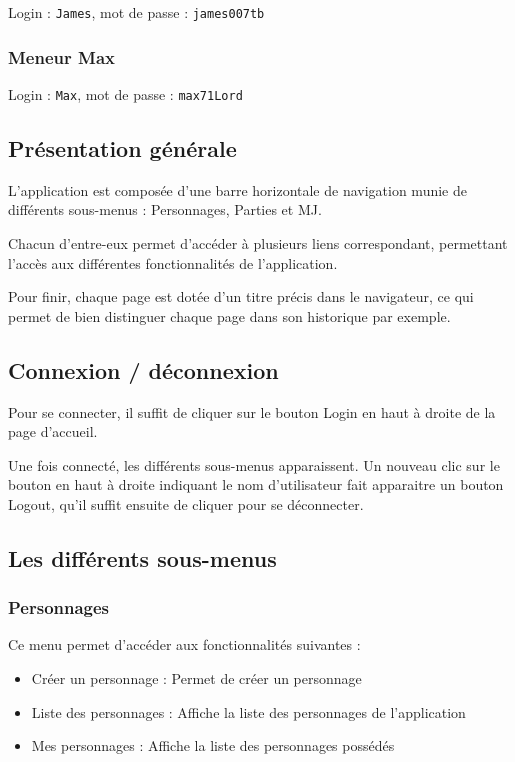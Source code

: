 \documentclass[a4paper, 11pt, titlepage]{article}
\begin{document}
Login : \lstinline!James!, mot de passe : \lstinline!james007tb!


\subsubsection {Meneur Max}

Login : \lstinline!Max!, mot de passe : \lstinline!max71Lord!




\subsection {Présentation générale}

L'application est composée d'une barre horizontale de navigation munie de différents sous-menus : Personnages, Parties et MJ.

Chacun d'entre-eux permet d'accéder à plusieurs liens correspondant, permettant l'accès aux différentes fonctionnalités de l'application.

Pour finir, chaque page est dotée d'un titre précis dans le navigateur, ce qui permet de bien distinguer chaque page dans son historique par exemple.

\subsection {Connexion / déconnexion}

Pour se connecter, il suffit de cliquer sur le bouton Login en haut à droite de la page d'accueil.

Une fois connecté, les différents sous-menus apparaissent. Un nouveau clic sur le bouton en haut à droite indiquant le nom d'utilisateur fait apparaitre un bouton Logout, qu'il suffit ensuite de cliquer pour se déconnecter.


\subsection {Les différents sous-menus}

\subsubsection {Personnages}

Ce menu permet d'accéder aux fonctionnalités suivantes :

\begin{itemize}
\item
Créer un personnage : Permet de créer un personnage

\item
Liste des personnages : Affiche la liste des personnages de l'application

\item
Mes personnages : Affiche la liste des personnages possédés

\end{itemize}
\end{document}
